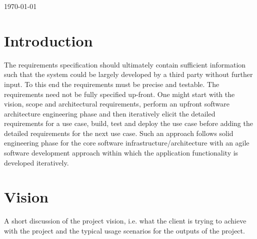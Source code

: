 \documentclass[a4paper,12pt]{article}
\begin{document}
\begin{titlepage}

{\large \today}\\[3cm] %


 

\vfill %

\end{titlepage}

\newpage

\section{Introduction}

The requirements specification should ultimately contain sufficient information such that the
system could be largely developed by a third party without further input. To this end the
requirements must be precise and testable.
The requirements need not be fully specified up-front. One might start with the vision, scope
and architectural requirements, perform an upfront software architecture engineering phase and
then iteratively elicit the detailed requirements for a use case, build, test and deploy the use
case before adding the detailed requirements for the next use case. Such an approach follows
solid engineering phase for the core software infrastructure/architecture with an agile software
development approach within which the application functionality is developed iteratively.

\section{Vision}

A short discussion of the project vision, i.e. what the client is trying to achieve with the project
and the typical usage scenarios for the outputs of the project.
\end{document}
